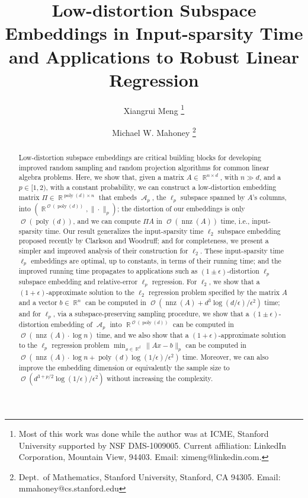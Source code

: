 \documentclass[11pt]{article}
\DeclareMathOperator{\poly}{poly}
\DeclareMathOperator{\bigO}{\mathcal{O}}
\DeclareMathOperator{\nnz}{nnz}
\DeclareMathOperator{\A}{\mathcal{A}}
\DeclareMathOperator{\R}{\mathbb{R}}
\begin{document}
\title{Low-distortion Subspace Embeddings in Input-sparsity Time \\ and
  Applications to Robust Linear Regression }

\author{
  Xiangrui Meng
  \thanks{
    Most of this work was done while the author was at 
    ICME, Stanford University supported by NSF DMS-1009005.
    Current affiliation: LinkedIn Corporation,
    Mountain View, 94403.
    Email: ximeng@linkedin.com.
  }
  \and
  Michael W. Mahoney
  \thanks{
    Dept.\ of Mathematics,
    Stanford University,
    Stanford, CA 94305.
    Email: mmahoney@cs.stanford.edu
  }
}

\date{}
\maketitle




\begin{abstract}\noindent
Low-distortion subspace embeddings are critical building blocks for developing
improved random sampling and random projection algorithms for common linear
algebra problems.
Here, we show that, given a matrix $A \in \R^{n \times d}$, with $n \gg d$, and
a $p \in [1, 2)$, with a constant probability, we can construct a low-distortion
embedding matrix $\Pi \in \R^{\poly(d) \times n}$ that embeds $\A_p$, the
$\ell_p$ subspace spanned by $A$'s columns, into $(\R^{\bigO(\poly(d))},
\|\cdot\|_p)$; the distortion of our embeddings is only $\bigO(\poly(d))$, and
we can compute $\Pi A$ in $\bigO(\nnz(A))$ time, i.e., input-sparsity time.
Our result generalizes the input-sparsity time $\ell_2$ subspace embedding
proposed recently by Clarkson and Woodruff; and for completeness, we present a
simpler and improved analysis of their construction for $\ell_2$.
These input-sparsity time $\ell_p$ embeddings are optimal, up to constants, in
terms of their running time; and the improved running time propagates to
applications such as $(1\pm \epsilon)$-distortion $\ell_p$ subspace embedding
and relative-error $\ell_p$ regression.
For $\ell_2$, we show that a $(1+\epsilon)$-approximate solution to the $\ell_2$
regression problem specified by the matrix $A$ and a vector $b \in \R^n$ can be
computed in $\bigO(\nnz(A) + d^3 \log(d/\epsilon) /\epsilon^2)$ time; and for
$\ell_p$, via a subspace-preserving sampling procedure, we show that a $(1\pm
\epsilon)$-distortion embedding of $\A_p$ into $\R^{\bigO(\poly(d))}$ can be
computed in $\bigO(\nnz(A) \cdot \log n)$ time, and we also show that a
$(1+\epsilon)$-approximate solution to the $\ell_p$ regression problem $\min_{x
  \in \R^d} \|A x - b\|_p$ can be computed in $\bigO(\nnz(A) \cdot \log n +
\poly(d) \log(1/\epsilon)/\epsilon^2)$ time.
Moreover, we can also improve the embedding dimension or equivalently the sample
size to $\bigO(d^{3+p/2} \log(1/\epsilon) / \epsilon^2)$ without increasing the
complexity.
\end{abstract}
\end{document}
